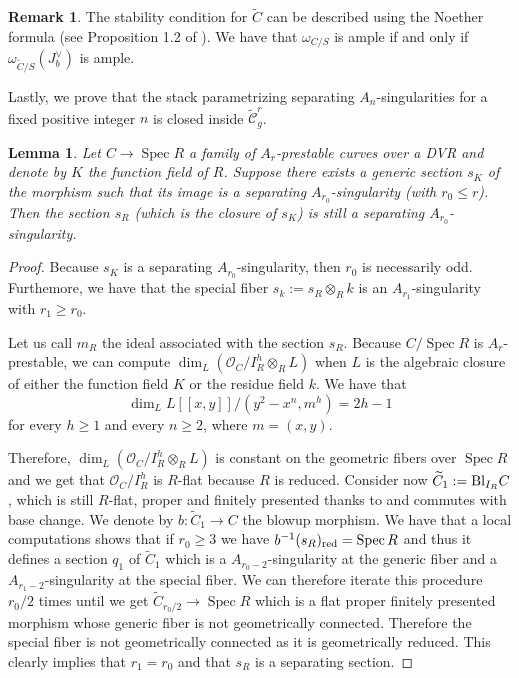 \documentclass{alggeom}
\numberwithin{equation}{section}
\numberwithin{subsection}{section}
\newtheorem{lemma}[theorem]{Lemma}
\theoremstyle{definition}
\newtheorem{remark}[theorem]{Remark}
\theoremstyle{remark}
\newcommand\cO{\mathcal{O}} \newcommand\cP{\mathcal{P}}
\newcommand\spec{\operatorname{Spec}}
\newcommand{\Ctilde}{\widetilde{\mathcal C}}
\begin{document}
\begin{remark}\label{rem:stab}
	The stability condition for $\widetilde{C}$ can be described using the Noether formula (see Proposition 1.2 of \cite{Cat}). We have that $\omega_{C/S}$ is ample if and only if $\omega_{\widetilde{C}/S}(J_b^{\vee})$ is ample.
\end{remark}

Lastly, we prove that the stack parametrizing separating $A_n$-singularities for a fixed positive integer $n$ is closed inside $\Ctilde_g^r$. 

\begin{lemma}\label{lem:sep-sing}
	Let $C\rightarrow \spec R$ a family of $A_r$-prestable curves over a DVR and denote by $K$ the function field of $R$. Suppose there exists a generic section $s_K$ of the morphism such that its image is a separating $A_{r_0}$-singularity (with $r_0\leq r$). Then the section $s_R$ (which is the closure of $s_K$) is still a separating $A_{r_0}$-singularity. 
\end{lemma}

\begin{proof}
	Because $s_K$ is a separating $A_{r_0}$-singularity, then $r_0$ is necessarily odd. Furthemore, we have that the special fiber $s_k:=s_R\otimes_R k$ is an $A_{r_1}$-singularity with $r_1\geq r_0$.
	
	Let us call $m_R$ the ideal associated with the section $s_R$. Because $C/\spec R$ is $A_r$-prestable, we can compute $\dim_L(\cO_C/I_R^h\otimes_R L)$ when $L$ is the algebraic closure of either the function field $K$ or the residue field $k$. We have that 
	$$ \dim_L L[[x,y]]/(y^2-x^n,m^h)=2h-1$$ 
	for every $h\geq 1$ and every $n\geq 2$, where $m=(x,y)$. 
	
	Therefore, $\dim_L(\cO_C/I_R^h\otimes_R L)$ is constant on the geometric fibers over $\spec R$ and we get that $\cO_C/I_R^h$ is $R$-flat  because $R$ is reduced.  Consider now $\widetilde{C}_1:={\rm Bl}_{I_R}C$, which is still $R$-flat, proper and finitely presented thanks to  and commutes with base change. We denote by $b:\widetilde{C}_1 \rightarrow C$ the blowup morphism. We have that a local computations shows that if $r_0\geq 3$ we have $b^{-1}(s_R)_{\rm red}=\spec R$ and thus it defines a section $q_1$ of $\widetilde{C}_1$ which is a $A_{r_0-2}$-singularity at the generic fiber and a $A_{r_1-2}$-singularity at the special fiber. We can therefore iterate this procedure $r_0/2$ times until we get $\widetilde{C}_{r_0/2}\rightarrow \spec R$ which is a flat proper finitely presented morphism whose generic fiber is not geometrically connected. Therefore the special fiber is not geometrically connected as it is geometrically reduced. This clearly implies that $r_1=r_0$ and that $s_R$ is a separating section.
\end{proof}
\end{document}
